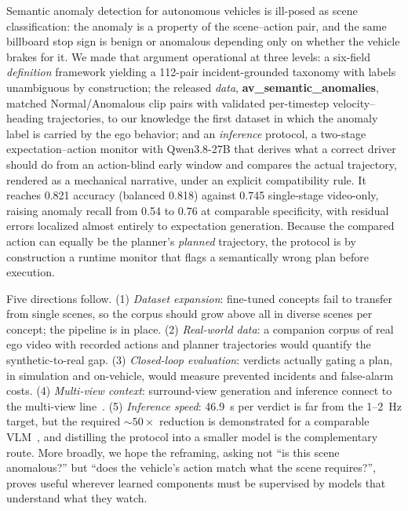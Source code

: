 \documentclass[conference]{IEEEtran}
\begin{document}
Semantic anomaly detection for autonomous vehicles is ill-posed as scene classification: the anomaly is a property of the scene--action pair, and the same billboard stop sign is benign or anomalous depending only on whether the vehicle brakes for it. We made that argument operational at three levels: a six-field \emph{definition} framework yielding a 112-pair incident-grounded taxonomy with labels unambiguous by construction; the released \emph{data}, \textbf{av\_semantic\_anomalies}, matched Normal/Anomalous clip pairs with validated per-timestep velocity--heading trajectories, to our knowledge the first dataset in which the anomaly label is carried by the ego behavior; and an \emph{inference} protocol, a two-stage expectation--action monitor with Qwen3.8-27B that derives what a correct driver should do from an action-blind early window and compares the actual trajectory, rendered as a mechanical narrative, under an explicit compatibility rule. It reaches 0.821 accuracy (balanced 0.818) against 0.745 single-stage video-only, raising anomaly recall from 0.54 to 0.76 at comparable specificity, with residual errors localized almost entirely to expectation generation. Because the compared action can equally be the planner's \emph{planned} trajectory, the protocol is by construction a runtime monitor that flags a semantically wrong plan before execution.

Five directions follow. (1) \emph{Dataset expansion}: fine-tuned concepts fail to transfer from single scenes, so the corpus should grow above all in diverse scenes per concept; the pipeline is in place. (2) \emph{Real-world data}: a companion corpus of real ego video with recorded actions and planner trajectories would quantify the synthetic-to-real gap. (3) \emph{Closed-loop evaluation}: verdicts actually gating a plan, in simulation and on-vehicle, would measure prevented incidents and false-alarm costs. (4) \emph{Multi-view context}: surround-view generation and inference connect to the multi-view line~\cite{b14,b15,b16,b17,b18}. (5) \emph{Inference speed}: 46.9~s per verdict is far from the 1--2~Hz target, but the required ${\sim}50\times$ reduction is demonstrated for a comparable VLM~\cite{b13}, and distilling the protocol into a smaller model is the complementary route. More broadly, we hope the reframing, asking not ``is this scene anomalous?'' but ``does the vehicle's action match what the scene requires?'', proves useful wherever learned components must be supervised by models that understand what they watch.
\end{document}

